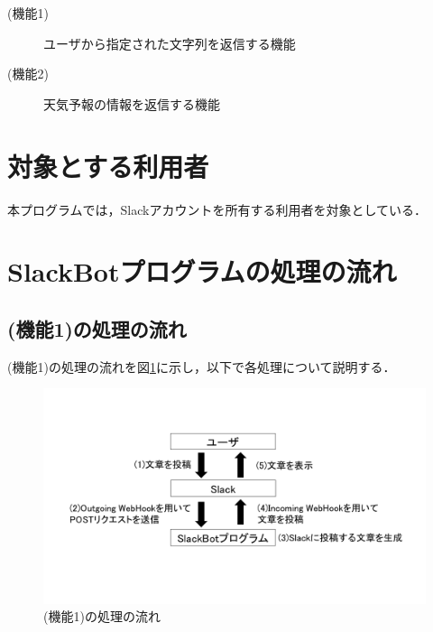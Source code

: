 \documentclass[12pt]{jsarticle}
\begin{document}
\begin{description}
\item[(機能1)] ユーザから指定された文字列を返信する機能
  
\item[(機能2)]\label{enum:function2} %
  天気予報の情報を返信する機能
\end{description}

\section{対象とする利用者}
本プログラムでは，Slackアカウントを所有する利用者を対象としている．


\section{SlackBotプログラムの処理の流れ}


\subsection{(機能1)の処理の流れ}
(機能1)の処理の流れを図\ref{fig:slackbot_flow}に示し，以下で各処理について説明する．
  \begin{figure}[t]
    \centering
    \includegraphics[width=1\textwidth]{figs/slackbot_flow8.png}
    \caption{(機能1)の処理の流れ}
    \label{fig:slackbot_flow}
  \end{figure}
\end{document}
